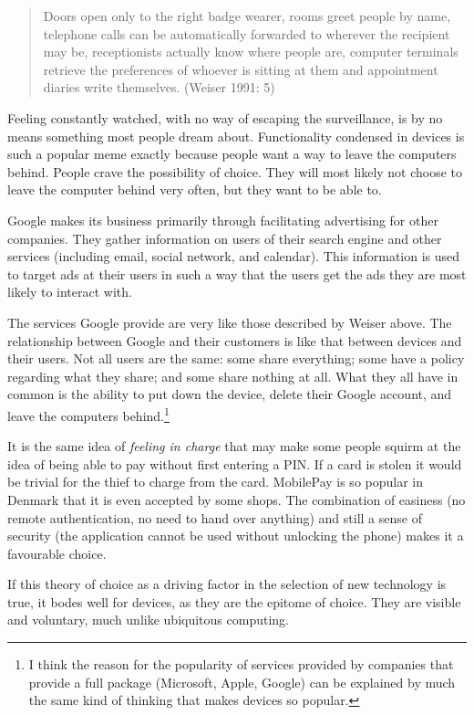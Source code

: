 \begin{quote}
    Doors open only to the right badge wearer, rooms greet people by name, telephone calls can be automatically forwarded to
    wherever the recipient may be, receptionists actually know where people are, computer terminals retrieve the preferences
    of whoever is sitting at them and appointment diaries write themselves. (Weiser 1991: 5)
\end{quote}

Feeling constantly watched, with no way of escaping the surveillance, is by no means something most people dream about.
Functionality condensed in devices is such a popular meme exactly because people want a way to leave the computers behind.
People crave the possibility of choice. They will most likely not choose to leave the computer behind very often, but they want to
be able to.

Google makes its business primarily through facilitating advertising for other companies. They gather information on users of
their search engine and other services (including email, social network, and calendar). This information is used to target ads
at their users in such a way that the users get the ads they are most likely to interact with.

The services Google provide are very like those described by Weiser above. The relationship between Google and their customers
is like that between devices and their users. Not all users are the same: some share everything; some have a policy regarding
what they share; and some share nothing at all. What they all have in common is the ability to put down the device, delete their
Google account, and leave the computers behind.\footnote{I think the reason for the popularity of services provided by companies
that provide a full package (Microsoft, Apple, Google) can be explained by much the same kind of thinking that makes devices so
popular.}

It is the same idea of \emph{feeling in charge} that may make some people squirm at the idea of being able to pay without first
entering a PIN. If a card is stolen it would be trivial for the thief to charge from the card. MobilePay is so popular in Denmark
that it is even accepted by some shops. The combination of easiness (no remote authentication, no need to hand over anything)
and still a sense of security (the application cannot be used without unlocking the phone) makes it a favourable choice.

If this theory of choice as a driving factor in the selection of new technology is true, it bodes well for devices, as they
are the epitome of choice. They are visible and voluntary, much unlike ubiquitous computing.
